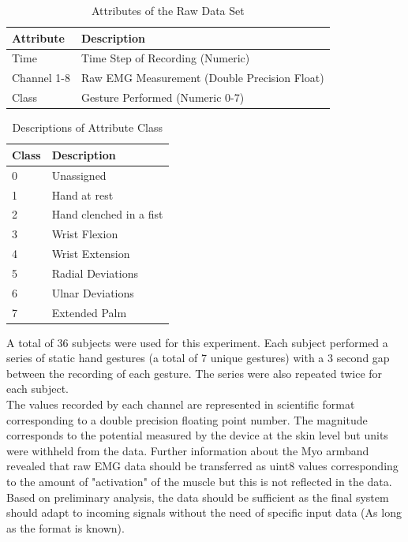 \documentclass[11pt]{article}
\begin{document}
	\begin{table}[H]
		\caption{Attributes of the Raw Data Set}
		\centering
		\begin{tabular}{l|l}
			Attribute   & Description             \\\hline
			Time        & Time Step of  Recording (Numeric)\\
			Channel 1-8 & Raw EMG Measurement (Double Precision Float)     \\
			Class       & Gesture Performed (Numeric 0-7)      \\\hline\hline
		\end{tabular}
	\end{table}

\begin{table}[H]
	\caption{Descriptions of Attribute Class}
	\centering
	\begin{tabular}{l|l}
		Class & Description             \\\hline
		0     & Unassigned              \\
		1     & Hand at rest            \\
		2     & Hand clenched in a fist \\
		3     & Wrist Flexion           \\
		4     & Wrist Extension         \\
		5     & Radial Deviations       \\
		6     & Ulnar Deviations        \\
		7     & Extended Palm           \\\hline\hline
	\end{tabular}
\end{table}
	
	\noindent
	A total of 36 subjects were used for this experiment. Each subject performed a series of static hand gestures (a total of 7 unique gestures) with a 3 second gap between the recording of each gesture. The series were also repeated twice for each subject.\\
	
	\noindent
	The values recorded by each channel are represented in scientific format corresponding to a double precision floating point number. The magnitude corresponds to the potential measured by the device at the skin level but units were withheld from the data. Further information about the Myo armband revealed that raw EMG data should be transferred as uint8 values corresponding to the amount of "activation" of the muscle \cite{myo_data} but this is not reflected in the data. Based on preliminary analysis, the data should be sufficient as the final system should adapt to incoming signals without the need of specific input data (As long as the format is known). \\
	
\end{document}
